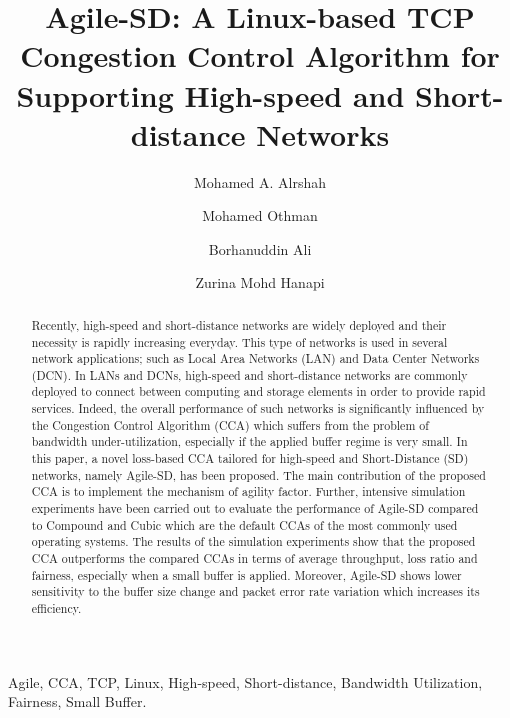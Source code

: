 \documentclass[preprint,3p,times,twocolumn,authoryear]{elsarticle}
\begin{document}
\begin{frontmatter}





\title{Agile-SD: A Linux-based TCP Congestion Control Algorithm for Supporting High-speed and Short-distance Networks}




\author[lable1]{Mohamed A. Alrshah}
\author[lable1]{Mohamed Othman}
\author[lable2]{Borhanuddin Ali}
\author[lable1]{Zurina Mohd Hanapi}
\address[lable1]{Department of Communication Technology and Network, Universiti Putra Malaysia, 43400 UPM, Serdang, Selangor D.E., Malaysia}
\address[lable2]{Department of Computer and Communication Systems Engineering, Universiti Putra Malaysia, 43400 UPM, Serdang, Selangor D.E, Malaysia.}

\begin{abstract}
Recently, high-speed and short-distance networks are widely deployed and their necessity is rapidly increasing everyday. This type of networks is used in several network applications; such as Local Area Networks (LAN) and Data Center Networks (DCN). In LANs and DCNs, high-speed and short-distance networks are commonly deployed to connect between computing and storage elements in order to provide rapid services. Indeed, the overall performance of such networks is significantly influenced by the Congestion Control Algorithm (CCA) which suffers from the problem of bandwidth under-utilization, especially if the applied buffer regime is very small. In this paper, a novel loss-based CCA tailored for high-speed and Short-Distance (SD) networks, namely Agile-SD, has been proposed. The main contribution of the proposed CCA is to implement the mechanism of agility factor. Further, intensive simulation experiments have been carried out to evaluate the performance of Agile-SD compared to Compound and Cubic which are the default CCAs of the most commonly used operating systems. The results of the simulation experiments show that the proposed CCA outperforms the compared CCAs in terms of average throughput, loss ratio and fairness, especially when a small buffer is applied. Moreover, Agile-SD shows lower sensitivity to the buffer size change and packet error rate variation which increases its efficiency.

\end{abstract}

\begin{keyword}
Agile\sep
CCA\sep
TCP\sep
Linux\sep
High-speed\sep
Short-distance\sep
Bandwidth Utilization\sep
Fairness\sep
Small Buffer.
\end{keyword}

\end{frontmatter}
\end{document}
